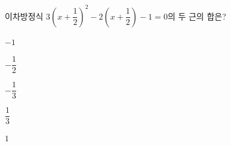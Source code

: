 이차방정식 $3\left(x+\dfrac{1}{2}\right)^2-2\left(x+\dfrac{1}{2}\right)-1=0$의 두 근의 합은?
\begin{choices32}{\rule[-3ex]{0pt}{8ex}$-1$}{\rule[-3ex]{0pt}{8ex}$-\dfrac{1}{2}$}{\rule[-3ex]{0pt}{8ex}$-\dfrac{1}{3}$}{\rule[-3ex]{0pt}{8ex}$\dfrac{1}{3}$}{\rule[-3ex]{0pt}{8ex}$1$}\end{choices32}
